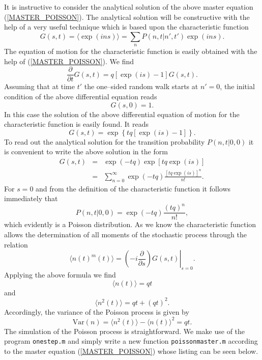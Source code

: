 It is instructive to consider the analytical solution of the 
above master equation (\ref{MASTER_POISSON}). The analytical
solution will be constructive with the help of a very useful 
technique which is based upon the characteristic function
\begin{equation*}
G(s,t) = \langle \exp(ins)\rangle = \sum_n P(n,t|n',t') \exp(ins).
\end{equation*}
The  equation of motion for the characteristic function is easily 
obtained with the help of (\ref{MASTER_POISSON}). We find
\begin{equation*}
\frac{\partial}{\partial t} G(s,t) = 
       q \left[ \exp(is) -1 \right] G(s,t).
\end{equation*}
Assuming that at time $t'$ the one--sided random walk starts at
$n'=0$, the initial condition of the above differential equation
reads
\begin{equation*}
G(s,0) = 1.
\end{equation*}
In this case the solution of the above differential equation of 
motion  for the characteristic function is easily found. It reads
\begin{equation*}
G(s,t) = \exp\left\{ tq \left[ \exp(is)-1 \right]\right\}.
\end{equation*}
To read out the analytical solution for the transition probability
$P(n,t|0,0)$ it is convenient to write the above solution in the
form
\begin{eqnarray*}
G(s,t) &= & \exp(-tq) \exp \left[ tq \exp(is)\right] \\
       &= & \sum_{n=0}^{\infty} \exp(-tq) 
             \frac{[tq\exp(is)]^n}{n!}.
\end{eqnarray*}
For $s=0$ and from the definition of the characteristic function
it follows immediately that
\begin{equation*}
P(n,t|0,0) = \exp(-tq) \frac{(tq)^n}{n!},
\end{equation*}
which evidently is a Poisson distribution. As we know the 
characteristic function allows the determination of all moments of 
the stochastic process through the relation
\begin{equation*}
\langle n(t)^m(t) \rangle = \left. 
       \left( -i \frac{\partial}{\partial s} \right) G(s,t)  
       \right|_{s=0}.
\end{equation*}
Applying the above formula we find
\begin{equation*}
\langle n(t) \rangle = qt
\end{equation*}
and
\begin{equation*}
\langle n^2(t) \rangle = qt + (qt)^2.
\end{equation*}
Accordingly, the variance of the Poisson process is given by
\begin{equation*}
\text{Var}(n) = \langle n^2(t) \rangle - \langle n(t) \rangle^2 = 
   qt.
\end{equation*}
The simulation of the Poisson process is straightforward. We make 
use of the program \texttt{onestep.m} and simply write a new 
function \texttt{poissonmaster.m} according to the 
master equation (\ref{MASTER_POISSON}) whose listing can be
seen below.

